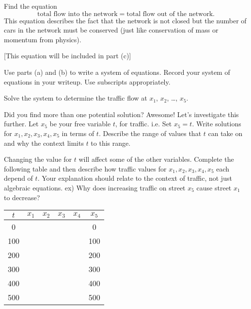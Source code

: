 \begin{lab}

    \item Find the equation
        \[ \text{total flow into the network} = \text{total flow out of the network}. \]
        This equation describes the fact that the network is not closed but the number of
        cars in the network must be conserved (just like conservation of mass or
        momentum from physics).

	[This equation will be included in part (c)]

    \item Use parts (a) and (b) to write a system of equations.  Record your system of
        equations in your writeup.   Use subscripts appropriately.



     \item  Solve the system to determine the traffic flow at $x_1$, $x_2$, \dots, $x_5$.


     Did you find more than one potential solution?  Awesome!  Let's investigate this further.   Let $x_5$ be your free variable $t$, for traffic.  i.e. Set $x_5=t$.   Write solutions for $x_1, x_2, x_3, x_4, x_5$ in terms of $t$.    Describe the range of values that $t$ can take on and why the context limits $t$ to this range.

    \item  Changing the value for $t$ will affect some of the other variables.   Complete the following table and then describe how traffic values for $x_1, x_2, x_3, x_4, x_5$ each depend of $t$.  Your explanation should relate to the context of traffic, not just algebraic equations.  ex)  Why does increasing traffic on street $x_5$ cause street $x_1$ to decrease?

\begin{center}
	\begin{tabular}{|c||c|c|c|c|c|}
		\hline
		$t$ & $x_1$ & $x_2$ & $x_3$ & $x_4$ & $x_5$ \\  \hline
		0  & & & & & 0 \\ \hline
		100 & & & & & 100 \\ \hline
		200 & & & & & 200 \\ \hline
		300 & & & & & 300 \\ \hline
		400 & & & & & 400 \\ \hline
		500 & & & & & 500 \\ \hline
	\end{tabular}
\end{center}


\end{lab}
